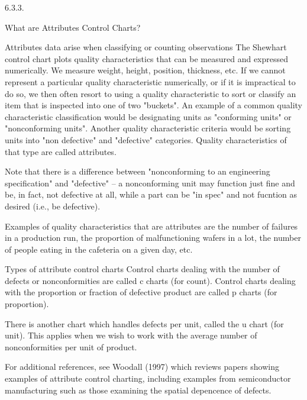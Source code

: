 
6.3.3.

What are Attributes Control Charts?

Attributes data arise when classifying or counting observations	The Shewhart control chart plots quality characteristics that can be measured and expressed numerically. We measure weight, height, position, thickness, etc. If we cannot represent a particular quality characteristic numerically, or if it is impractical to do so, we then often resort to using a quality characteristic to sort or classify an item that is inspected into one of two "buckets".
An example of a common quality characteristic classification would be designating units as "conforming units" or "nonconforming units". Another quality characteristic criteria would be sorting units into "non defective" and "defective" categories. Quality characteristics of that type are called attributes.

Note that there is a difference between "nonconforming to an engineering specification" and "defective" -- a nonconforming unit may function just fine and be, in fact, not defective at all, while a part can be "in spec" and not fucntion as desired (i.e., be defective).

Examples of quality characteristics that are attributes are the number of failures in a production run, the proportion of malfunctioning wafers in a lot, the number of people eating in the cafeteria on a given day, etc.

Types of attribute control charts	Control charts dealing with the number of defects or nonconformities are called c charts (for count).
Control charts dealing with the proportion or fraction of defective product are called  p charts (for proportion).

There is another chart which handles defects per unit, called the u chart (for unit). This applies when we wish to work with the average number of nonconformities per unit of product.

For additional references, see Woodall (1997) which reviews papers showing examples of attribute control charting, including examples from semiconductor manufacturing such as those examining the spatial depencence of defects.

